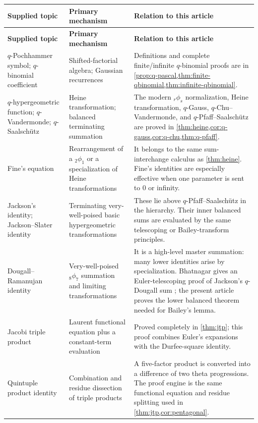 \documentclass[11pt]{article}
\theoremstyle{blueplain}
\theoremstyle{bluedef}
\begin{document}
\begin{longtable}{@{}p{}p{}p{}@{}}
\toprule
\textbf{Supplied topic} & \textbf{Primary mechanism} & \textbf{Relation to this article}\\
\midrule
\endfirsthead
\toprule
\textbf{Supplied topic} & \textbf{Primary mechanism} & \textbf{Relation to this article}\\
\midrule
\endhead
$q$-Pochhammer symbol; $q$-binomial coefficient
& Shifted-factorial algebra; Gaussian recurrences
& Definitions and complete finite/infinite $q$-binomial proofs are in \cref{prop:q-pascal,thm:finite-qbinomial,thm:infinite-qbinomial}.\\[0.4em]
$q$-hypergeometric function; $q$-Vandermonde; $q$-Saalsch\"utz
& Heine transformation; balanced terminating summation
& The modern ${}_r\phi_s$ normalization, Heine transformation, $q$-Gauss, $q$-Chu--Vandermonde, and $q$-Pfaff--Saalsch\"utz are proved in \cref{thm:heine,cor:q-gauss,cor:q-chu,thm:q-pfaff}.\\[0.4em]
Fine's equation
& Rearrangement of a ${}_2\phi_1$ or a specialization of Heine transformations
& It belongs to the same sum-interchange calculus as \cref{thm:heine}.  Fine's identities are especially effective when one parameter is sent to $0$ or infinity.\\[0.4em]
Jackson's identity; Jackson--Slater identity
& Terminating very-well-poised basic hypergeometric transformations
& These lie above $q$-Pfaff--Saalsch\"utz in the hierarchy.  Their inner balanced sums are evaluated by the same telescoping or Bailey-transform principles.\\[0.4em]
Dougall--Ramanujan identity
& Very-well-poised ${}_8\phi_7$ summation and limiting transformations
& It is a high-level master summation: many lower identities arise by specialization.  Bhatnagar gives an Euler-telescoping proof of Jackson's $q$-Dougall sum \cite{Bhatnagar2011}; the present article proves the lower balanced theorem needed for Bailey's lemma.\\[0.4em]
Jacobi triple product
& Laurent functional equation plus a constant-term evaluation
& Proved completely in \cref{thm:jtp}; this proof combines Euler's expansions with the Durfee-square identity.\\[0.4em]
Quintuple product identity
& Combination and residue dissection of triple products
& A five-factor product is converted into a difference of two theta progressions.  The proof engine is the same functional equation and residue splitting used in \cref{thm:jtp,cor:pentagonal}.\\[0.4em]

\end{longtable}
\end{document}
